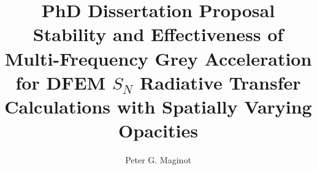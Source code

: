 \documentclass[final,3p,times]{elsarticle}
\begin{document}
\begin{frontmatter}



\title{PhD Dissertation Proposal \\
\vspace{0.25in}
Stability and Effectiveness of Multi-Frequency Grey Acceleration for DFEM $S_N$ Radiative Transfer Calculations with Spatially Varying Opacities}


\author{Peter G. Maginot} 



\address{Department of Nuclear Engineering, Texas A\&M University, 
  3133 TAMU, College Station, TX 77843, USA}

\begin{abstract}


\end{abstract}
\end{frontmatter}
\end{document}
